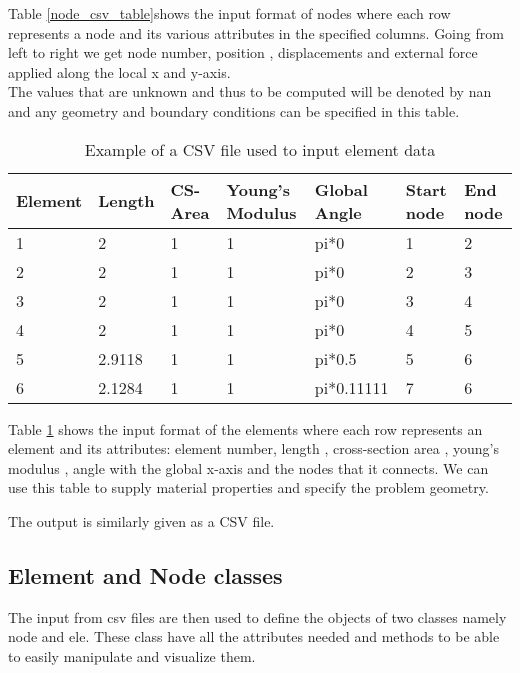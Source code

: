 Table \ref{node_csv_table}shows the input format of nodes where each row represents a node and its various attributes in the specified columns. Going from left to right we get node number, position , displacements and external force applied along the local x and y-axis.\\

The values that are unknown and thus to be computed will be denoted by nan and any geometry and boundary conditions can be specified in this table.

\begin{table}[h!]
	\centering
	\begin{tabular}{|l|l|l|l|l|l|l|}
		\hline
		Element & Length & CS-Area & Young's Modulus & Global Angle & Start node & End node \\
		\hline
		1               & 2      & 1                    & 1              & pi*0         & 1             & 2           \\
		2               & 2      & 1                    & 1              & pi*0         & 2             & 3           \\
		3               & 2      & 1                    & 1              & pi*0         & 3             & 4           \\
		4               & 2      & 1                    & 1              & pi*0         & 4             & 5           \\
		5               & 2.9118 & 1                    & 1              & pi*0.5       & 5             & 6           \\
		6               & 2.1284 & 1                    & 1              & pi*0.11111   & 7             & 6           \\
     	\hline
	\end{tabular}
	\caption{Example of a CSV file used to input element data}
	\label{element_csv_table}
\end{table}


Table \ref{element_csv_table} shows the input format of the elements where each row represents an element and its attributes: element number, length , cross-section area , young's modulus , angle with the global x-axis and the nodes that it connects. We can use this table to supply material properties and specify the problem geometry.

The output is similarly given as a CSV file.

\subsection{Element and Node classes}
The input from csv files are then used to define the objects of two classes namely node and ele. These class have all the attributes needed and methods to be able to easily manipulate and visualize them.

